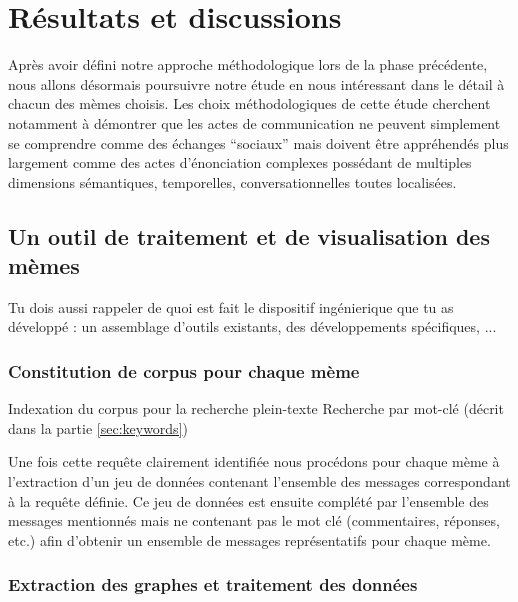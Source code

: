\chapter{R\'esultats et discussions}

Apr\`es avoir d\'efini notre approche m\'ethodologique lors de la phase pr\'ec\'edente, nous allons d\'esormais poursuivre notre \'etude en nous int\'eressant dans le d\'etail \`a chacun des m\`emes choisis. Les choix m\'ethodologiques de cette \'etude cherchent notamment \`a d\'emontrer que les actes de communication ne peuvent simplement se comprendre comme des \'echanges {\textquotedblleft}sociaux{\textquotedblright} mais doivent \^etre appr\'ehend\'es plus largement comme des actes d{\textquoteright}\'enonciation complexes poss\'edant de multiples dimensions s\'emantiques, temporelles, conversationnelles toutes localis\'ees. 

\section{Un outil de traitement et de visualisation des mèmes}

Tu dois aussi rappeler de quoi est fait le dispositif ingénierique que tu as développé : un assemblage d'outils existants, des développements spécifiques, ... 

\subsection[Constitution de corpus pour chaque mème]{Constitution de corpus pour chaque mème}


Indexation du corpus pour la recherche plein-texte 
Recherche par mot-clé (décrit dans la partie \ref{sec:keywords})

Une fois cette requ\^ete clairement identifiée nous procédons pour
chaque mème à l{\textquoteright}extraction d{\textquoteright}un jeu
de données contenant l{\textquoteright}ensemble des messages
correspondant à la requ\^ete définie. Ce jeu de données est
ensuite complété par l{\textquoteright}ensemble des messages
mentionnés mais ne contenant pas le mot clé (commentaires,
réponses, etc.) afin d{\textquoteright}obtenir un ensemble de
messages représentatifs pour chaque mème.


\subsection[Extraction des graphes et traitement des données]{Extraction des graphes et traitement des données}

